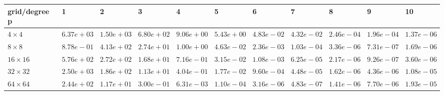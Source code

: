 \begin{tabular}{lllllllllll}
\hline
 grid/degree p   & 1          & 2          & 3          & 4          & 5          & 6          & 7          & 8          & 9          & 10         \\
\hline
 $4 \times 4$    & $6.37e+03$ & $1.50e+03$ & $6.80e+02$ & $9.06e+00$ & $5.43e+00$ & $4.83e-02$ & $4.32e-02$ & $2.46e-04$ & $1.96e-04$ & $1.37e-06$ \\
 $8 \times 8$    & $8.78e-01$ & $4.13e+02$ & $2.74e+01$ & $1.00e+00$ & $4.63e-02$ & $2.36e-03$ & $1.03e-04$ & $3.36e-06$ & $7.31e-07$ & $1.69e-06$ \\
 $16 \times 16$  & $5.76e+02$ & $2.72e+02$ & $1.68e+01$ & $7.16e-01$ & $3.15e-02$ & $1.08e-03$ & $6.25e-05$ & $2.17e-06$ & $9.26e-07$ & $3.60e-06$ \\
 $32 \times 32$  & $2.50e+03$ & $1.86e+02$ & $1.13e+01$ & $4.04e-01$ & $1.77e-02$ & $9.60e-04$ & $4.48e-05$ & $1.62e-06$ & $4.36e-06$ & $1.08e-05$ \\
 $64 \times 64$  & $2.44e+02$ & $1.17e+01$ & $3.00e-01$ & $6.31e-03$ & $1.10e-04$ & $3.16e-06$ & $4.83e-07$ & $1.41e-06$ & $7.70e-06$ & $1.93e-05$ \\
\hline
\end{tabular}